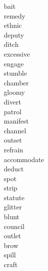 \documentclass[b5paper, 11pt]{ctexart}
\begin{document}
\begin{multicols*}{3}
\begin{description}
\item[bait]

\item[remedy]

\item[ethnic]

\item[deputy]

\item[ditch]

\item[excessive]

\item[engage]

\item[stumble]

\item[chamber]

\item[gloomy]

\item[divert]

\item[patrol]

\item[manifest]

\item[channel]

\item[outset]

\item[refrain]

\item[accommodate]

\item[deduct]

\item[spot]

\item[strip]

\item[statute]

\item[glitter]

\item[blunt]

\item[council]

\item[outlet]

\item[brow]

\item[spill]

\item[craft]


\end{description}
\end{multicols*}
\end{document}
